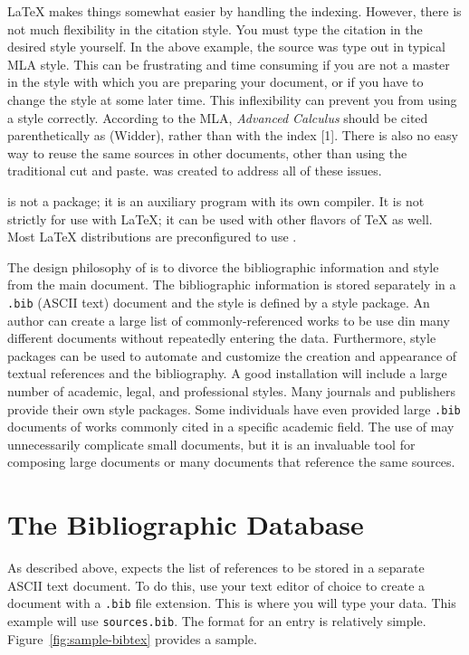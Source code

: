 \LaTeX{} makes things somewhat easier by handling the indexing.
However, there is not much flexibility in the citation style.  You
must type the citation in the desired style yourself.  In the above
example, the source was type out in typical MLA style.  This can be
frustrating and time consuming if you are not a master in the style
with which you are preparing your document, or if you have to change
the style at some later time.  This inflexibility can prevent you from
using a style correctly.  According to the MLA, \textit{Advanced
  Calculus} should be cited parenthetically as (Widder), rather than
with the index [1].  There is also no easy way to reuse the same
sources in other documents, other than using the traditional cut and
paste.  \BibTeX{} was created to address all of these issues.

\BibTeX{} is not a package; it is an auxiliary program with its own
compiler.  It is not strictly for use with \LaTeX{}; it can be used
with other flavors of \TeX{} as well.  Most \LaTeX{} distributions are
preconfigured to use \BibTeX{}.

The design philosophy of \BibTeX{} is to divorce the bibliographic
information and style from the main document.  The bibliographic
information is stored separately in a \texttt{.bib} (ASCII text)
document and the style is defined by a style package.  An author can
create a large list of commonly-referenced works to be use din many
different documents without repeatedly entering the data.
Furthermore, style packages can be used to automate and customize the
creation and appearance of textual references and the bibliography.  A
good \BibTeX{} installation will include a large number of academic,
legal, and professional styles.  Many journals and publishers provide
their own style packages.  Some individuals have even provided large
\texttt{.bib} documents of works commonly cited in a specific academic
field.  The use of \BibTeX{} may unnecessarily complicate small
documents, but it is an invaluable tool for composing large documents
or many documents that reference the same sources.

\section{The Bibliographic Database}
\label{sec:bibl-datab}

As described above, \BibTeX{} expects the list of references to be
stored in a separate ASCII text document.  To do this, use your text
editor of choice to create a document with a \texttt{.bib} file
extension.  This is where you will type your data.  This example will
use \texttt{sources.bib}.  The format for an entry is relatively
simple.  Figure~\ref{fig:sample-bibtex} provides a sample.

